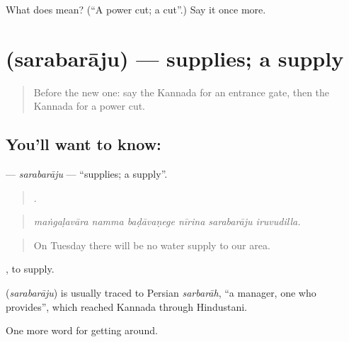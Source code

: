 \begin{tcolorbox}[breakable,colback=teal!4,colframe=teal!35!black,title={Before you move on}]
What does  mean? (\textquotedblleft{}A power cut; a cut\textquotedblright{}.) Say it once more.
\end{tcolorbox}
\section[\texorpdfstring{\kn{ಸರಬರಾಜು} (sarabarāju)}{ಸರಬರಾಜು (sarabarāju)}]{ (sarabarāju) — supplies; a supply}

\label{lesson:KA-C470-sarabaraju}



\begin{quote}
Before the new one: say the Kannada for an entrance gate, then the Kannada for a power cut.
\end{quote}

\subsection*{You'll want to know: }
\textbf{} — \emph{sarabarāju} — \textquotedblleft{}supplies; a supply\textquotedblright{}.

\begin{quote}
     .
\end{quote}

\begin{quote}
\emph{maṅgaḷavāra namma baḍāvaṇege nīrina sarabarāju iruvudilla.}
\end{quote}

\begin{quote}
On Tuesday there will be no water supply to our area.
\end{quote}

 , to supply.

\begin{cousinweb}
\textbf{} (\emph{sarabarāju}) is usually traced to Persian \emph{sarbarāh}, \textquotedblleft{}a manager, one who provides\textquotedblright{}, which reached Kannada through Hindustani.
\end{cousinweb}

\begin{grammarlens}[title={What you've built}]
One more word for getting around.
\end{grammarlens}

